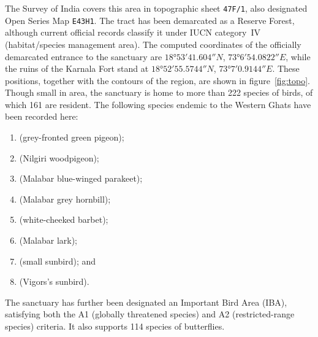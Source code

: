 \documentclass[a4paper, 11pt]{article}
\begin{document}
	The Survey of India covers this area in topographic sheet \texttt{47F/1}, also designated Open Series Map \texttt{E43H1}. The tract has been demarcated as a Reserve Forest, although current official records classify it under IUCN category~IV (habitat/species management area). The computed coordinates of the officially demarcated entrance to the sanctuary are $\ang{18;53;41.604}N$, $\ang{73;6;54.0822}E$, while the ruins of the Karnala Fort stand at $\ang{18;52;55.5744}N$, $\ang{73;7;0.9144}E$. These positions, together with the contours of the region, are shown in figure~\ref{fig:topo}.\\
	
	Though small in area, the sanctuary is home to more than 222 species of birds, of which 161 are resident. The following species endemic to the Western Ghats have been recorded here:%
	\begin{enumerate}
		
		\item {} (grey-fronted green pigeon);
		
		\item {} (Nilgiri woodpigeon);
		
		\item {} (Malabar blue-winged parakeet);
		
		\item {} (Malabar grey hornbill);
		
		\item {} (white-cheeked barbet);
		
		\item {} (Malabar lark);
		
		\item {} (small sunbird); and 
		
		\item {} (Vigors's sunbird).
		
	\end{enumerate}
	
	The sanctuary has further been designated an Important Bird Area (IBA), satisfying both the A1 (globally threatened species) and A2 (restricted-range species) criteria. It also supports 114 species of butterflies.
	
\end{document}
